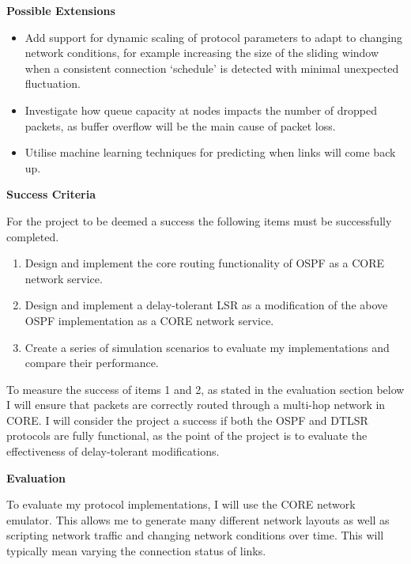 \documentclass[withindex,glossary,openany]{cam-thesis}
\begin{document}
\vspace{8mm}
\LARGE\textbf{Possible Extensions}\normalsize

\begin{itemize}
\item
Add support for dynamic scaling of protocol parameters to adapt to changing network conditions, for example increasing the size of the sliding window when a consistent connection `schedule’ is detected with minimal unexpected fluctuation.

\item
Investigate how queue capacity at nodes impacts the number of dropped packets, as buffer overflow will be the main cause of packet loss.

\item
Utilise machine learning techniques for predicting when links will come back up.
\end{itemize}

\vspace{8mm}
\LARGE\textbf{Success Criteria}\normalsize

For the project to be deemed a success the following items must be successfully completed.

\begin{enumerate}
\item
Design and implement the core routing functionality of OSPF as a CORE network service.

\item
Design and implement a delay-tolerant LSR as a modification of the above OSPF implementation as a CORE network service.

\item
Create a series of simulation scenarios to evaluate my implementations and compare their performance.
\end{enumerate}

To measure the success of items 1 and 2, as stated in the evaluation section below I will ensure that packets are correctly routed through a multi-hop network in CORE. I will consider the project a success if both the OSPF and DTLSR protocols are fully functional, as the point of the project is to evaluate the effectiveness of delay-tolerant modifications.

\vspace{8mm}
\LARGE\textbf{Evaluation}\normalsize

To evaluate my protocol implementations, I will use the CORE network emulator. This allows me to generate many different network layouts as well as scripting network traffic and changing network conditions over time. This will typically mean varying the connection status of links.
\end{document}
